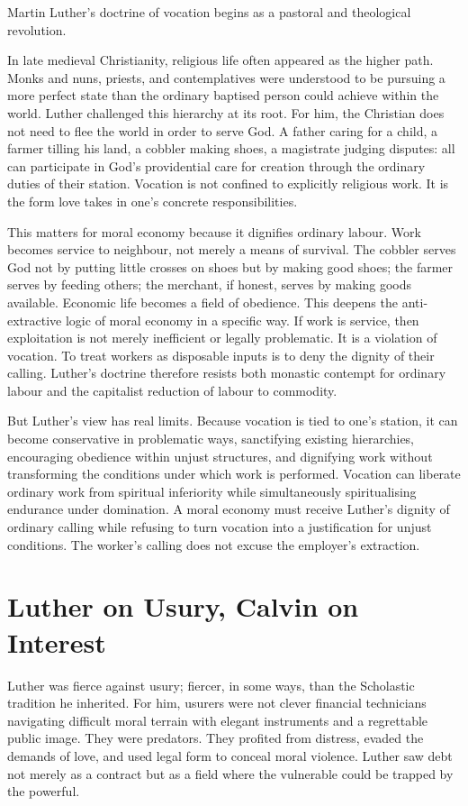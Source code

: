 \documentclass[11pt,a4paper,oneside]{book}
\begin{document}
Martin Luther's doctrine of vocation begins as a pastoral and theological revolution.

In late medieval Christianity, religious life often appeared as the higher path. Monks and nuns, priests, and contemplatives were understood to be pursuing a more perfect state than the ordinary baptised person could achieve within the world. Luther challenged this hierarchy at its root. For him, the Christian does not need to flee the world in order to serve God. A father caring for a child, a farmer tilling his land, a cobbler making shoes, a magistrate judging disputes: all can participate in God's providential care for creation through the ordinary duties of their station. Vocation is not confined to explicitly religious work. It is the form love takes in one's concrete responsibilities.

This matters for moral economy because it dignifies ordinary labour. Work becomes service to neighbour, not merely a means of survival. The cobbler serves God not by putting little crosses on shoes but by making good shoes; the farmer serves by feeding others; the merchant, if honest, serves by making goods available. Economic life becomes a field of obedience. This deepens the anti-extractive logic of moral economy in a specific way. If work is service, then exploitation is not merely inefficient or legally problematic. It is a violation of vocation. To treat workers as disposable inputs is to deny the dignity of their calling. Luther's doctrine therefore resists both monastic contempt for ordinary labour and the capitalist reduction of labour to commodity.

But Luther's view has real limits. Because vocation is tied to one's station, it can become conservative in problematic ways, sanctifying existing hierarchies, encouraging obedience within unjust structures, and dignifying work without transforming the conditions under which work is performed. Vocation can liberate ordinary work from spiritual inferiority while simultaneously spiritualising endurance under domination. A moral economy must receive Luther's dignity of ordinary calling while refusing to turn vocation into a justification for unjust conditions. The worker's calling does not excuse the employer's extraction.

\section*{Luther on Usury, Calvin on Interest}

Luther was fierce against usury; fiercer, in some ways, than the Scholastic tradition he inherited. For him, usurers were not clever financial technicians navigating difficult moral terrain with elegant instruments and a regrettable public image. They were predators. They profited from distress, evaded the demands of love, and used legal form to conceal moral violence. Luther saw debt not merely as a contract but as a field where the vulnerable could be trapped by the powerful.
\end{document}
